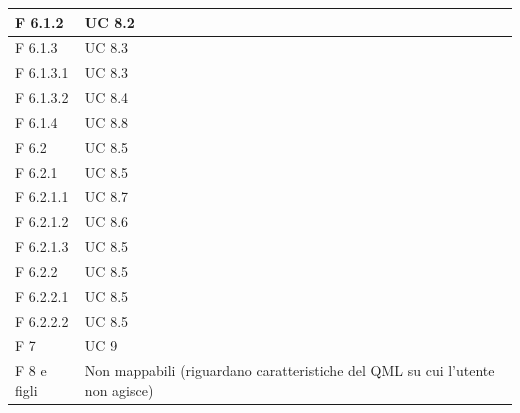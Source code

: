\documentclass[a4paper,11pt]{article}
\begin{document}
\begin{longtable}{p{}p{}}
F 6.1.2 & UC 8.2\\
\midrule
F 6.1.3 & UC 8.3\\
\midrule
F 6.1.3.1 & UC 8.3\\
\midrule
F 6.1.3.2 & UC 8.4\\
\midrule
F 6.1.4 & UC 8.8\\
\midrule
F 6.2 & UC 8.5\\
\midrule
F 6.2.1 & UC 8.5\\
\midrule
F 6.2.1.1 & UC 8.7\\
\midrule
F 6.2.1.2 & UC 8.6\\
\midrule
F 6.2.1.3 & UC 8.5\\
\midrule
F 6.2.2 & UC 8.5\\
\midrule
F 6.2.2.1 & UC 8.5\\
\midrule
F 6.2.2.2 & UC 8.5\\
\midrule
F 7 & UC 9\\
\midrule
F 8 e figli & Non mappabili (riguardano caratteristiche del QML su cui l'utente non agisce)\\

			
			\end{longtable}
			
\end{document}
